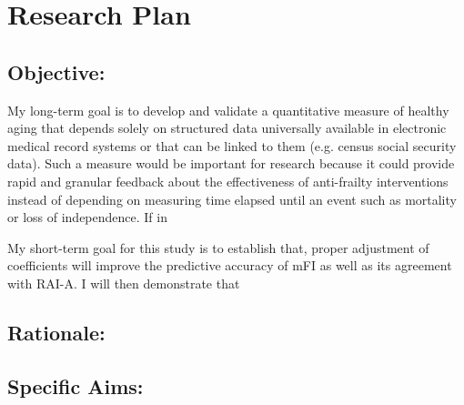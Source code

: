 \section{Research Plan }\label{research-plan}


\subsection{Objective:}\label{objective}
  
My long-term goal is to develop and validate a quantitative measure of healthy aging that depends solely on structured data universally available in electronic medical record systems or that can be linked to them (e.g. census social security data). Such a measure would be important for research because it could provide rapid and granular feedback about the effectiveness of anti-frailty interventions instead of depending on measuring time elapsed until an event such as mortality or loss of independence. If in  

My short-term goal for this study is to establish that, proper adjustment of coefficients will improve the predictive accuracy of mFI as well as its agreement with RAI-A. I will then demonstrate that 

\subsection{Rationale:}\label{rationale}

\subsection{Specific Aims:}\label{specific-aims}
